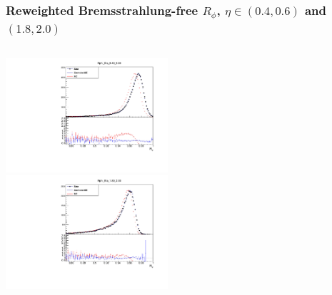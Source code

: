 \documentclass{beamer}
\begin{document}
\begin{frame}
\frametitle{Reweighted Bremsstrahlung-free $R_\phi$, $\eta \in (0.4, 0.6)$ and $(1.8, 2.0)$}

\begin{columns}[t]
\centering
\includegraphics[width=6cm]{Rphi_Rew_Eta_4_6_Local_Rew_noBS.pdf}\\
\centering
\includegraphics[width=6cm]{Rphi_Rew_Eta_18_20_Local_Rew_noBS.pdf}
\end{columns}
\end{frame}
\end{document}
